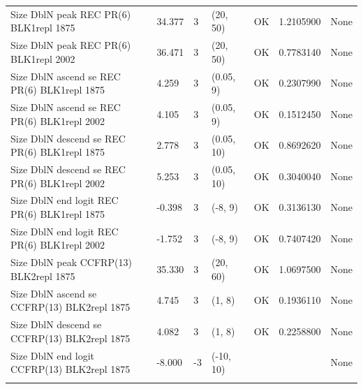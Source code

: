 \documentclass[
  english,
  a4paper,
]{article}
\begin{document}
\begin{landscape}
\begin{longtable}[t]{>{\raggedright\arraybackslash}p{8.5cm}lllll>{\raggedright\arraybackslash}p{4cm}}
Size DblN peak REC PR(6) BLK1repl 1875 & 34.377 & 3 & (20, 50) & OK & 1.2105900 & None\\
Size DblN peak REC PR(6) BLK1repl 2002 & 36.471 & 3 & (20, 50) & OK & 0.7783140 & None\\
Size DblN ascend se REC PR(6) BLK1repl 1875 & 4.259 & 3 & (0.05, 9) & OK & 0.2307990 & None\\
Size DblN ascend se REC PR(6) BLK1repl 2002 & 4.105 & 3 & (0.05, 9) & OK & 0.1512450 & None\\
Size DblN descend se REC PR(6) BLK1repl 1875 & 2.778 & 3 & (0.05, 10) & OK & 0.8692620 & None\\
Size DblN descend se REC PR(6) BLK1repl 2002 & 5.253 & 3 & (0.05, 10) & OK & 0.3040040 & None\\
Size DblN end logit REC PR(6) BLK1repl 1875 & -0.398 & 3 & (-8, 9) & OK & 0.3136130 & None\\
Size DblN end logit REC PR(6) BLK1repl 2002 & -1.752 & 3 & (-8, 9) & OK & 0.7407420 & None\\
Size DblN peak CCFRP(13) BLK2repl 1875 & 35.330 & 3 & (20, 60) & OK & 1.0697500 & None\\
Size DblN ascend se CCFRP(13) BLK2repl 1875 & 4.745 & 3 & (1, 8) & OK & 0.1936110 & None\\
Size DblN descend se CCFRP(13) BLK2repl 1875 & 4.082 & 3 & (1, 8) & OK & 0.2258800 & None\\
Size DblN end logit CCFRP(13) BLK2repl 1875 & -8.000 & -3 & (-10, 10) &  &  & None\\*
\end{longtable}
\endgroup{}
\end{landscape}
\endgroup{}
\end{document}
